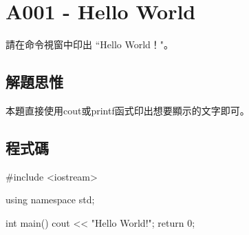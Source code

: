\section{A001 - Hello World}

請在命令視窗中印出 ``Hello World！"。

\subsection{解題思惟}
本題直接使用cout或printf函式印出想要顯示的文字即可。
	
\subsection{程式碼}
\begin{cppcode}
#include <iostream>

using namespace std;

int main()
{
	cout << "Hello World!";
	return 0;
}
\end{cppcode}
